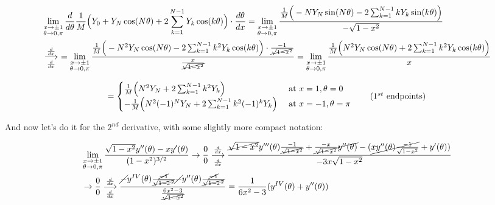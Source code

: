 \documentclass[10pt]{article}
\begin{document}
\begin{align*}
&\lim_{\substack{x \to \pm 1 \\ \theta \to 0,\pi}} \frac{d}{d\theta} \frac{1}{M} \Big( Y_0 + Y_N \cos(N\theta) + 2 \sum_{k=1}^{N-1} Y_k \cos(k\theta) \Big) \cdot \frac{d\theta}{dx} = \lim_{\substack{x \to \pm 1 \\ \theta \to 0,\pi}} \frac{\frac{1}{M} \Big(-N Y_N \sin(N\theta) - 2 \sum_{k=1}^{N-1} k Y_k \sin(k\theta) \Big)}{-\sqrt{1-x^2}} \\
&\underset{\frac{d}{dx}}{\overset{\frac{d}{dx}}{\longrightarrow}}\ = \lim_{\substack{x \to \pm 1 \\ \theta \to 0,\pi}} \frac{\frac{1}{M} \Big(-N^2 Y_N \cos(N\theta) - 2 \sum_{k=1}^{N-1} k^2 Y_k \cos(k\theta) \Big) \cdot \frac{-1}{\cancel{\sqrt{1-x^2}}}}{\frac{x}{\cancel{\sqrt{1-x^2}}}} = \lim_{\substack{x \to \pm 1 \\ \theta \to 0,\pi}} \frac{\frac{1}{M} \Big(N^2 Y_N \cos(N\theta) + 2 \sum_{k=1}^{N-1} k^2 Y_k \cos(k\theta) \Big)}{x}
\end{align*}

\[
= \begin{cases} \frac{1}{M} \Big(N^2 Y_N + 2 \sum_{k=1}^{N-1} k^2 Y_k \Big) & \text{ at } x=1, \theta=0 \\ -\frac{1}{M} \Big(N^2 (-1)^N Y_N + 2 \sum_{k=1}^{N-1} k^2 (-1)^k Y_k \Big) & \text{ at } x=-1, \theta=\pi \end{cases} \tag{$1^{st}$ endpoints}
\]\vspace{2mm}

And now let's do it for the $2^{nd}$ derivative, with some slightly more compact notation:

\begin{align*}
&\lim_{\substack{x \to \pm 1 \\ \theta \to 0,\pi}} \frac{\sqrt{1 - x^2} y''(\theta) - x y'(\theta)}{(1-x^2)^{3/2}} \rightarrow \frac{0}{0} \underset{\frac{d}{dx}}{\overset{\frac{d}{dx}}{\longrightarrow}} \frac{\cancel{\sqrt{1-x^2}}y'''(\theta)\frac{-1}{\cancel{\sqrt{1-x^2}}} + \cancel{\frac{-x}{\sqrt{1-x^2}}y''(\theta)} - (\cancel{xy''(\theta)\frac{-1}{\sqrt{1-x^2}}} + y'(\theta))}{-3x\sqrt{1-x^2}}\\
& \rightarrow \frac{0}{0} \underset{\frac{d}{dx}}{\overset{\frac{d}{dx}}{\longrightarrow}} \frac{\cancel{-}y^{IV}(\theta)\frac{\cancel{-1}}{\cancel{\sqrt{1-x^2}}} \cancel{-} y''(\theta)\frac{\cancel{-1}}{\cancel{\sqrt{1-x^2}}}}{\frac{6x^2 - 3}{\cancel{\sqrt{1-x^2}}}} = \frac{1}{6x^2 - 3}(y^{IV}(\theta) + y''(\theta))
\end{align*}
\end{document}
